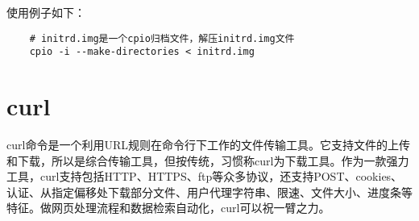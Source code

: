 \documentclass[a4paper,left=2.5cm,right=2.5cm,11pt]{article}
\begin{document}
	使用例子如下：
	\begin{lstlisting}
	# initrd.img是一个cpio归档文件，解压initrd.img文件
	cpio -i --make-directories < initrd.img
	\end{lstlisting}

\section{curl}
	curl命令是一个利用URL规则在命令行下工作的文件传输工具。它支持文件的上传和下载，所以是综合传输工具，但按传统，习惯称curl为下载工具。作为一款强力工具，curl支持包括HTTP、HTTPS、ftp等众多协议，还支持POST、cookies、认证、从指定偏移处下载部分文件、用户代理字符串、限速、文件大小、进度条等特征。做网页处理流程和数据检索自动化，curl可以祝一臂之力。\par
\end{document}
